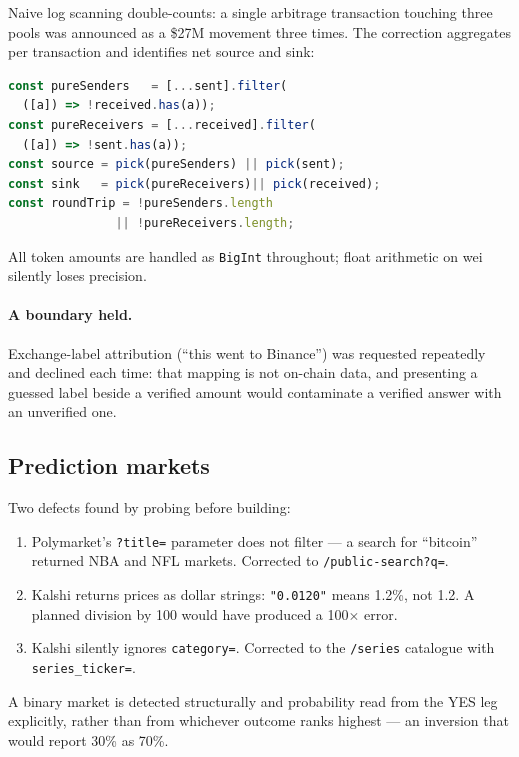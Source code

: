 \documentclass[10pt,twocolumn]{article}
\newcommand{\code}[1]{\texttt{\small #1}}
\begin{document}
Naive log scanning double-counts: a single arbitrage transaction touching three pools was
announced as a \$27M movement three times. The correction aggregates per transaction and
identifies net source and sink:

\begin{lstlisting}[language=JavaScript]
const pureSenders   = [...sent].filter(
  ([a]) => !received.has(a));
const pureReceivers = [...received].filter(
  ([a]) => !sent.has(a));
const source = pick(pureSenders) || pick(sent);
const sink   = pick(pureReceivers)|| pick(received);
const roundTrip = !pureSenders.length
               || !pureReceivers.length;
\end{lstlisting}

All token amounts are handled as \code{BigInt} throughout; float arithmetic on wei
silently loses precision.

\paragraph{A boundary held.} Exchange-label attribution (``this went to Binance'') was
requested repeatedly and declined each time: that mapping is not on-chain data, and
presenting a guessed label beside a verified amount would contaminate a verified answer
with an unverified one.

\subsection{Prediction markets}

Two defects found by probing before building:

\begin{enumerate}\itemsep1pt
\item Polymarket's \code{?title=} parameter does not filter --- a search for
``bitcoin'' returned NBA and NFL markets. Corrected to \code{/public-search?q=}.
\item Kalshi returns prices as dollar strings: \code{"0.0120"} means 1.2\%, not 1.2.
A planned division by 100 would have produced a 100$\times$ error.
\item Kalshi silently ignores \code{category=}. Corrected to the \code{/series}
catalogue with \code{series\_ticker=}.
\end{enumerate}

A binary market is detected structurally and probability read from the YES leg
explicitly, rather than from whichever outcome ranks highest --- an inversion that would
report 30\% as 70\%.
\end{document}
